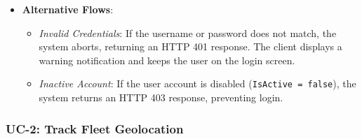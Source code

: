 \begin{itemize}
\begin{enumerate}
  \end{enumerate}
  \item \textbf{Alternative Flows}:
  \begin{itemize}
    \item \emph{Invalid Credentials}: If the username or password does not match, the system aborts, returning an HTTP 401 response. The client displays a warning notification and keeps the user on the login screen.
    \item \emph{Inactive Account}: If the user account is disabled (\texttt{IsActive = false}), the system returns an HTTP 403 response, preventing login.
  \end{itemize}
\end{itemize}

\subsubsection{UC-2: Track Fleet Geolocation}
